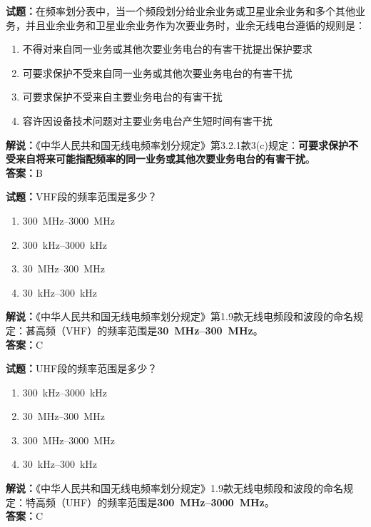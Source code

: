 \documentclass{ctexbook}
\begin{document}
\vspace{\baselineskip}

\noindent\textbf{试题：}在频率划分表中，当一个频段划分给业余业务或卫星业余业务和多个其他业务，并且业余业务和卫星业余业务作为次要业务时，业余无线电台遵循的规则是：
\begin{enumerate}[leftmargin=3em]
  \item 不得对来自同一业务或其他次要业务电台的有害干扰提出保护要求
  \item 可要求保护不受来自同一业务或其他次要业务电台的有害干扰
  \item 可要求保护不受来自主要业务电台的有害干扰
  \item 容许因设备技术问题对主要业务电台产生短时间有害干扰
\end{enumerate}
\noindent\textbf{解说：}《中华人民共和国无线电频率划分规定》第3.2.1款3(c)规定：\textbf{可要求保护不受来自将来可能指配频率的同一业务或其他次要业务电台的有害干扰}。\\
\textbf{答案：}B

\vspace{\baselineskip}

\noindent\textbf{试题：}VHF段的频率范围是多少？
\begin{enumerate}[leftmargin=3em]
  \item \qtyrange[range-phrase=\mbox{到}]{300}{3000}{\MHz}
  \item \qtyrange[range-phrase=\mbox{到}]{300}{3000}{\kHz}
  \item \qtyrange[range-phrase=\mbox{到}]{30}{300}{\MHz}
  \item \qtyrange[range-phrase=\mbox{到}]{30}{300}{\kHz}
\end{enumerate}
\noindent\textbf{解说：}《中华人民共和国无线电频率划分规定》第1.9款无线电频段和波段的命名规定：甚高频（VHF）的频率范围是\textbf{\qtyrange[range-phrase=\mbox{到}]{30}{300}{\MHz}}。\\\noindent\textbf{答案：}C

\vspace{\baselineskip}

\noindent\textbf{试题：}UHF段的频率范围是多少？
\begin{enumerate}[leftmargin=3em]
  \item \qtyrange[range-phrase=\mbox{到}]{300}{3000}{\kHz}
  \item \qtyrange[range-phrase=\mbox{到}]{30}{300}{\MHz}
  \item \qtyrange[range-phrase=\mbox{到}]{300}{3000}{\MHz}
  \item \qtyrange[range-phrase=\mbox{到}]{30}{300}{\kHz}
\end{enumerate}
\noindent\textbf{解说：}《中华人民共和国无线电频率划分规定》1.9款无线电频段和波段的命名规定：特高频（UHF）的频率范围是\textbf{\qtyrange[range-phrase=\mbox{到}]{300}{3000}{\MHz}}。\\\noindent\textbf{答案：}C
\end{document}

